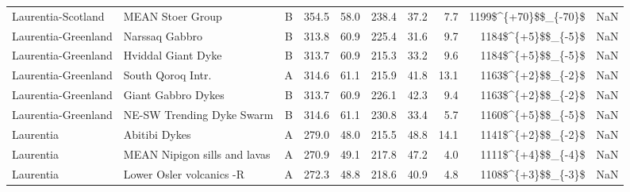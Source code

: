\begin{longtable}{p{1 in}p{1 in}rrrrrrr}
            Laurentia-Scotland &                                   MEAN Stoer Group &      B &     354.5 &      58.0 & 238.4 &  37.2 &       7.7 &   1199\$\textasciicircum \{+70\}\$\$\_\{-70\}\$ &                                                NaN \\
           Laurentia-Greenland &                                     Narssaq Gabbro &      B &     313.8 &      60.9 & 225.4 &  31.6 &       9.7 &     1184\$\textasciicircum \{+5\}\$\$\_\{-5\}\$ &                                                NaN \\
           Laurentia-Greenland &                                 Hviddal Giant Dyke &      B &     313.7 &      60.9 & 215.3 &  33.2 &       9.6 &     1184\$\textasciicircum \{+5\}\$\$\_\{-5\}\$ &                                                NaN \\
           Laurentia-Greenland &                                  South Qoroq Intr. &      A &     314.6 &      61.1 & 215.9 &  41.8 &      13.1 &     1163\$\textasciicircum \{+2\}\$\$\_\{-2\}\$ &                                                NaN \\
           Laurentia-Greenland &                                 Giant Gabbro Dykes &      B &     313.7 &      60.9 & 226.1 &  42.3 &       9.4 &     1163\$\textasciicircum \{+2\}\$\$\_\{-2\}\$ &                                                NaN \\
           Laurentia-Greenland &                          NE-SW Trending Dyke Swarm &      B &     314.6 &      61.1 & 230.8 &  33.4 &       5.7 &     1160\$\textasciicircum \{+5\}\$\$\_\{-5\}\$ &                                                NaN \\
                     Laurentia &                                      Abitibi Dykes &      A &     279.0 &      48.0 & 215.5 &  48.8 &      14.1 &     1141\$\textasciicircum \{+2\}\$\$\_\{-2\}\$ &                                                NaN \\
                     Laurentia &                       MEAN Nipigon sills and lavas &      A &     270.9 &      49.1 & 217.8 &  47.2 &       4.0 &     1111\$\textasciicircum \{+4\}\$\$\_\{-4\}\$ &                                                NaN \\
                     Laurentia &                           Lower Osler volcanics -R &      A &     272.3 &      48.8 & 218.6 &  40.9 &       4.8 &     1108\$\textasciicircum \{+3\}\$\$\_\{-3\}\$ &                                                NaN \\

\end{longtable}
